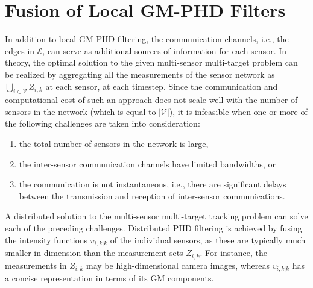 \section{Fusion of Local GM-PHD Filters}
\label{sec:fusion_step}

In addition to local GM-PHD filtering, the communication channels, i.e., the edges in $\mathcal E$, can serve as additional sources of information for each sensor.
In theory, the optimal solution to the given multi-sensor multi-target problem can be realized by aggregating all the measurements of the sensor network as $\bigcup_{i\in \mathcal V}Z_{i,k}$ at each sensor, at each timestep. Since the communication and computational cost of such an approach does not scale well with the number of sensors in the network (which is equal to $|\mathcal V|$), it is infeasible when one or more of the following challenges are taken into consideration: 
\begin{enumerate}
    \item the total number of sensors in the network is large,
    \item the inter-sensor communication channels have limited bandwidths, or 
    \item the communication is not instantaneous, i.e., there are significant delays between the transmission and reception of inter-sensor communications.
\end{enumerate}
A distributed solution to the multi-sensor multi-target tracking problem can solve each of the preceding challenges. Distributed PHD filtering is achieved by fusing the intensity functions $v_{i,k|k}$ of the individual sensors, as these are typically much smaller in dimension than the measurement sets $Z_{i,k}$. For instance, the measurements in $Z_{i,k}$ may be high-dimensional camera images, whereas $v_{i,k|k}$ has a concise representation in terms of its GM components.

